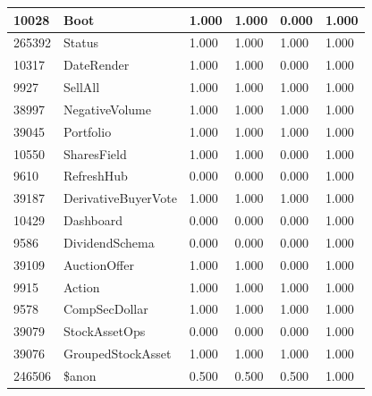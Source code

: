 \documentclass[a4paper]{article}
\newlength{\DUtablewidth} %
\begin{document}
\begin{longtable*}[c]{|p{0.160\DUtablewidth}|p{0.160\DUtablewidth}|p{0.160\DUtablewidth}|p{0.160\DUtablewidth}|p{0.160\DUtablewidth}|p{0.160\DUtablewidth}|}
10028
 & 
Boot
 & 
1.000
 & 
1.000
 & 
0.000
 & 
1.000
 \\
\hline

265392
 & 
Status
 & 
1.000
 & 
1.000
 & 
1.000
 & 
1.000
 \\
\hline

10317
 & 
DateRender
 & 
1.000
 & 
1.000
 & 
0.000
 & 
1.000
 \\
\hline

9927
 & 
SellAll
 & 
1.000
 & 
1.000
 & 
1.000
 & 
1.000
 \\
\hline

38997
 & 
NegativeVolume
 & 
1.000
 & 
1.000
 & 
1.000
 & 
1.000
 \\
\hline

39045
 & 
Portfolio
 & 
1.000
 & 
1.000
 & 
1.000
 & 
1.000
 \\
\hline

10550
 & 
SharesField
 & 
1.000
 & 
1.000
 & 
0.000
 & 
1.000
 \\
\hline

9610
 & 
RefreshHub
 & 
0.000
 & 
0.000
 & 
0.000
 & 
1.000
 \\
\hline

39187
 & 
DerivativeBuyerVote
 & 
1.000
 & 
1.000
 & 
1.000
 & 
1.000
 \\
\hline

10429
 & 
Dashboard
 & 
0.000
 & 
0.000
 & 
0.000
 & 
1.000
 \\
\hline

9586
 & 
DividendSchema
 & 
0.000
 & 
0.000
 & 
0.000
 & 
1.000
 \\
\hline

39109
 & 
AuctionOffer
 & 
1.000
 & 
1.000
 & 
0.000
 & 
1.000
 \\
\hline

9915
 & 
Action
 & 
1.000
 & 
1.000
 & 
1.000
 & 
1.000
 \\
\hline

9578
 & 
CompSecDollar
 & 
1.000
 & 
1.000
 & 
1.000
 & 
1.000
 \\
\hline

39079
 & 
StockAssetOps
 & 
0.000
 & 
0.000
 & 
0.000
 & 
1.000
 \\
\hline

39076
 & 
GroupedStockAsset
 & 
1.000
 & 
1.000
 & 
1.000
 & 
1.000
 \\
\hline

246506
 & 
\$anon
 & 
0.500
 & 
0.500
 & 
0.500
 & 
1.000
 \\
\hline


\end{longtable*}
\end{document}
